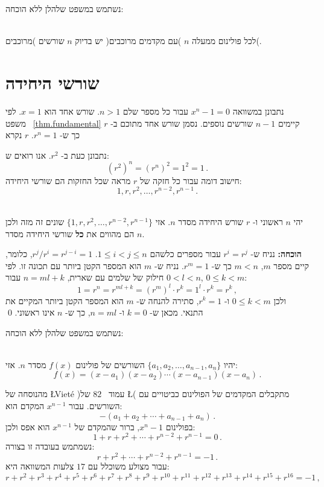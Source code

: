 נשתמש במשפט שלהלן ללא הוכחה:
\begin{theorem}\label{thm.fundamental}\mbox{}\\
לכל פולינום ממעלה 
$n$
)עם מקדמים מרוכבים(
יש בדיוק
$n$
שורשים
)מרוכבים(.
\end{theorem}



\section{שורשי היחידה}\label{s.roots}

נתבונן במשוואה
$x^{n}-1=0$
עבור כל מספר שלם
$n>	 1$.
שורש אחד הוא
$x=1$.
לפי משפט~%
\ref{thm.fundamental}
קיימים
$n-1$
שורשים נוספים. נסמן שורש אחד מתוכם ב-%
$r$
כך ש-%
$r^{n}=1$.
$r$
נקרא

נתבונן כעת ב-%
$r^2$.
אנו רואים ש:
\[
(r^2)^n=(r^{n})^2=1^2=1\,.
\]
חישוב דומה עבור כל חזקה של
$r$
מראה שכל החזקות הם שורשי היחידה:
\[
1, r, r^2, \ldots, r^{n-2}, r^{n-1}\,.
\]



\begin{theorem}\label{thm.roots-of-unity}\mbox{}\\
יהי
$n$
ראשוני ו-%
$r$
שורש היחידה מסדר 
$n$.
אזי
$\{1,r,r^2,\ldots,r^{n-2},r^{n-1}\}$
שונים זה מזה ולכן הם מהווים את 
\textbf{כל}
שורשי היחידה מסדר
$n$.
\end{theorem}
\textbf{הוכחה:}
נניח ש-%
$r^i=r^j$
עבור מספרים כלשהם
$1\leq i<j\leq n$.
$r^j/r^i=r^{j-i}=1$,
כלומר, קיים מספר
$m$,
$m<n$
כך ש-%
$r^m=1$.
נניח ש-%
$m$
הוא המספר הקטן ביותר עם תכונה זו. 
לפי חילוק של שלמים עם שארית,
$n=ml+k$
עבור
$0<l<n$,
$0\leq k<m$:
\[
1=r^n=r^{ml+k}=(r^m)^l\cdot r^k=1^l\cdot r^k=r^k\,,
\]
ולכן 
$0\leq k<m$ 
ו-%
$r^k=1$,
סתירה להנחה ש-%
$m$
הוא המספר הקטן ביותר המקיים את התנאי. מכאן ש-%
$k=0$
ו-%
$n=ml$,
כך ש-%
$n$
אינו ראשוני.
\qed

נשתמש במשפט שלהלן ללא הוכחה:
\begin{theorem}\mbox{}\\
יהיו
$\{a_1,a_2,\ldots,a_{n-1},a_n\}$
השורשים של פולינום
$f(x)$
מסדר
$n$.
אזי:
\[
f(x) =(x-a_1) (x-a_2)\cdots (x-a_{n-1})(x-a_n)\,.
\]
\end{theorem}



מהנוסחה של
\L{Viet\'{e}}
)עמוד~%
$82$ 
של
\L{\cite{jorg}}(
מתקבלים המקדמים של הפולינום כביטויים עם השורשים. עבור
$x^{n-1}$
המקדם הוא:
\[
-(a_1+a_2+\cdots+a_{n-1}+a_n)\,.
\]
בפולינום
$x^n-1$,
ברור שהמקדם של 
$x^{n-1}$
הוא אפס ולכן:
\[
1+r+r^2+\cdots + r^{n-2}+r^{n-1}=0\,.
\]
נשמתמש בעובדה זו בצורה:
\[
r+r^2+\cdots + r^{n-2}+r^{n-1}=-1\,.
\]
עבור מצולע משוכלל עם 
$17$
צלעות המשוואה היא:
\[
r+r^2+r^3+r^4+r^5+r^6+r^7+r^8+r^9+r^{10}+r^{11}+r^{12}+r^{13}+r^{14} + r^{15}+r^{16}=-1\,,
\]

